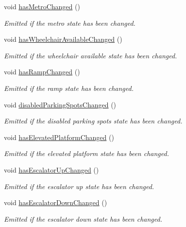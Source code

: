 \begin{DoxyCompactItemize}
void \mbox{\hyperlink{classQRail_1_1StationEngine_1_1Station_acc096fcb18ab5c6863c223b41d009411}{has\+Metro\+Changed}} ()
\begin{DoxyCompactList}\small\item\em Emitted if the metro state has been changed. \end{DoxyCompactList}\item 
void \mbox{\hyperlink{classQRail_1_1StationEngine_1_1Station_ab9dbccc3c22e2f85f02598e188b30e1f}{has\+Wheelchair\+Available\+Changed}} ()
\begin{DoxyCompactList}\small\item\em Emitted if the wheelchair available state has been changed. \end{DoxyCompactList}\item 
void \mbox{\hyperlink{classQRail_1_1StationEngine_1_1Station_ab062941ecd9106dacafa586ab6902bfb}{has\+Ramp\+Changed}} ()
\begin{DoxyCompactList}\small\item\em Emitted if the ramp state has been changed. \end{DoxyCompactList}\item 
void \mbox{\hyperlink{classQRail_1_1StationEngine_1_1Station_a10925196dc9a1414b0e1777e080cfd24}{disabled\+Parking\+Spots\+Changed}} ()
\begin{DoxyCompactList}\small\item\em Emitted if the disabled parking spots state has been changed. \end{DoxyCompactList}\item 
void \mbox{\hyperlink{classQRail_1_1StationEngine_1_1Station_aef8be214289efd0d14dd303018ad4fbb}{has\+Elevated\+Platform\+Changed}} ()
\begin{DoxyCompactList}\small\item\em Emitted if the elevated platform state has been changed. \end{DoxyCompactList}\item 
void \mbox{\hyperlink{classQRail_1_1StationEngine_1_1Station_a1f352fe7283ca3d3d0c37bfc8f614638}{has\+Escalator\+Up\+Changed}} ()
\begin{DoxyCompactList}\small\item\em Emitted if the escalator up state has been changed. \end{DoxyCompactList}\item 
void \mbox{\hyperlink{classQRail_1_1StationEngine_1_1Station_a905a7e763de04a36cd12ea8b8b8ad47d}{has\+Escalator\+Down\+Changed}} ()
\begin{DoxyCompactList}\small\item\em Emitted if the escalator down state has been changed. \end{DoxyCompactList}\item 

\end{DoxyCompactItemize}

